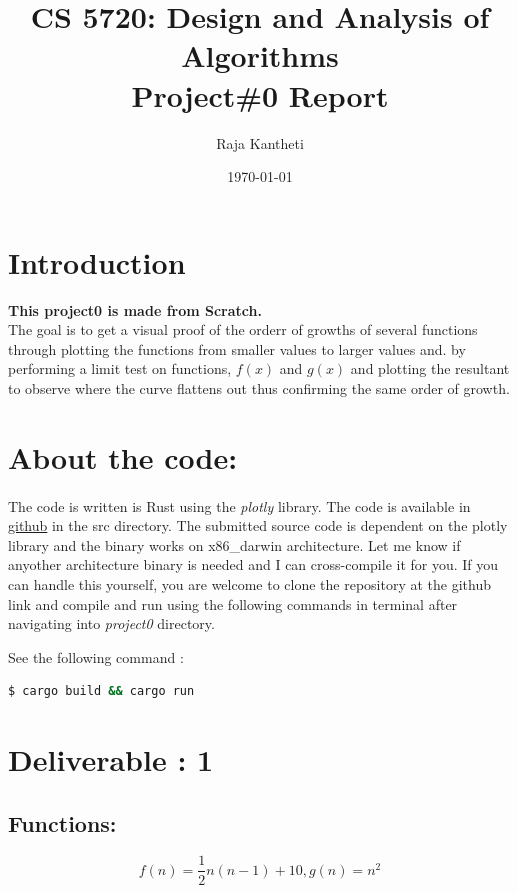 \documentclass{article}
\title{CS 5720: Design and Analysis of Algorithms \\ Project\#0 Report}
\author{Raja Kantheti}
\date{\today}
\begin{document}
\maketitle

\section{Introduction}

\textbf{This project0 is made from Scratch.} \\
The goal is to get a visual proof of the orderr of growths of several functions through plotting the functions
from smaller values to larger values and. by performing a limit test on functions, \(f(x)\) and \(g(x)\) and plotting the resultant
to observe where the curve flattens out thus confirming the same order of growth. 

\section{About the code: }
\paragraph{}The code is written is Rust using the \emph{plotly} library.
The code is available in \href{https://github.com/Marlboro522/Design-And-Analysis-of-Algorithms/tree/main/Ass-pro/PRO0/project0}{github} in the src directory. 
The submitted source code is dependent on the plotly library and the binary works on x86\_darwin architecture. Let me know if anyother architecture binary is needed and I can cross-compile it for you. 
If you can handle this yourself, you are welcome to clone the repository at the github link and compile and run using the following commands in terminal after navigating into \emph{project0} directory. 

\noindent See the following command :
\begin{lstlisting}[language=bash]
  $ cargo build && cargo run
\end{lstlisting}

\section{Deliverable : 1}
\subsection{Functions: }
\[
    f(n) = \frac{1}{2}n(n-1) + 10, g(n) = n^2 
\]
\end{document}
